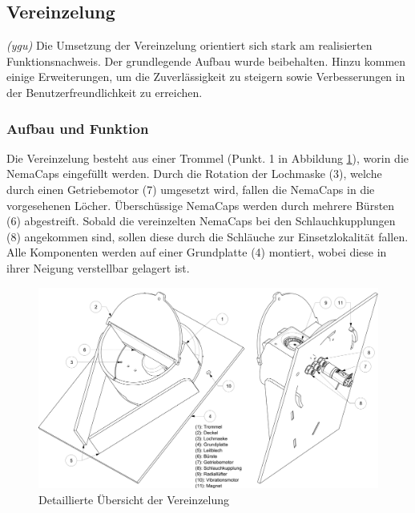 \subsection{Vereinzelung} 
\label{sec:Vereinzelung}
\textit{(ygu)} Die Umsetzung der Vereinzelung orientiert sich stark am realisierten Funktionsnachweis. Der grundlegende Aufbau wurde beibehalten. Hinzu kommen einige Erweiterungen, um die Zuverlässigkeit zu steigern sowie Verbesserungen in der Benutzerfreundlichkeit zu erreichen.

\subsubsection{Aufbau und Funktion}
Die Vereinzelung besteht aus einer Trommel (Punkt. 1 in Abbildung \ref{fig:details_vereinzelung}), worin die NemaCaps eingefüllt werden. Durch die Rotation der Lochmaske (3), welche durch einen Getriebemotor (7) umgesetzt wird, fallen die NemaCaps in die vorgesehenen Löcher. Überschüssige NemaCaps werden durch mehrere Bürsten (6) abgestreift. Sobald die vereinzelten NemaCaps bei den Schlauchkupplungen (8) angekommen sind, sollen diese durch die Schläuche zur Einsetzlokalität fallen. Alle Komponenten werden auf einer Grundplatte (4) montiert, wobei diese in ihrer Neigung verstellbar gelagert ist.
	\begin{figure}[H]
	\includegraphics[scale=0.455]{Illustrationen/6-Umsetzung/details_vereinzelung.jpg}
	\caption{Detaillierte Übersicht der Vereinzelung}
	\label{fig:details_vereinzelung}
	\end{figure}

